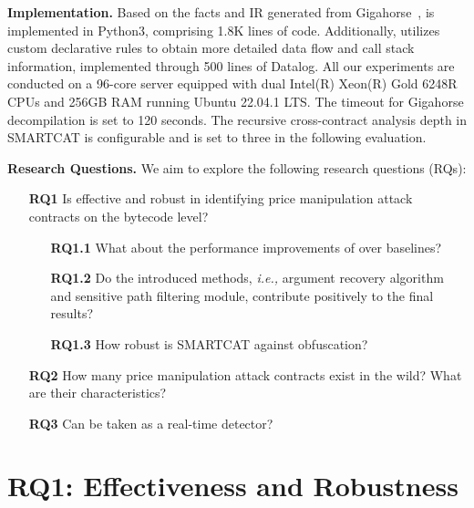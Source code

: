 \noindent \textbf{Implementation.}
Based on the facts and IR generated from Gigahorse~\cite{grech2019gigahorse}, {\tool} is implemented in Python3, comprising 1.8K lines of code. Additionally, {\tool} utilizes custom declarative rules to obtain more detailed data flow and call stack information, implemented through 500 lines of Datalog. 
All our experiments are conducted on a 96-core server equipped with dual Intel(R) Xeon(R) Gold 6248R CPUs and 256GB RAM running Ubuntu 22.04.1 LTS. The timeout for Gigahorse decompilation is set to 120 seconds.
The recursive cross-contract analysis depth in SMARTCAT is configurable and is set to three in the following evaluation.

\noindent \textbf{Research Questions.} We aim to explore the following research questions (RQs):

\begin{itemize}


\item[\textbf{RQ1}]  Is {\tool} effective and robust in identifying price manipulation attack contracts on the bytecode level?

\begin{itemize}
\item[\textbf{RQ1.1}] What about the performance improvements of {\tool} over baselines?
\item[\textbf{RQ1.2}] Do the introduced methods, \textit{i.e.,} argument recovery algorithm and sensitive path filtering module, contribute positively to the final results?
\item[\textbf{RQ1.3}] How robust is SMARTCAT against obfuscation?
\end{itemize}

\item[\textbf{RQ2}] How many price manipulation attack contracts exist in the wild? What are their characteristics?

\item[\textbf{RQ3}] Can {\tool} be taken as a real-time detector?

\end{itemize}

\section{RQ1: Effectiveness and Robustness}
\label{sec:rq1}



